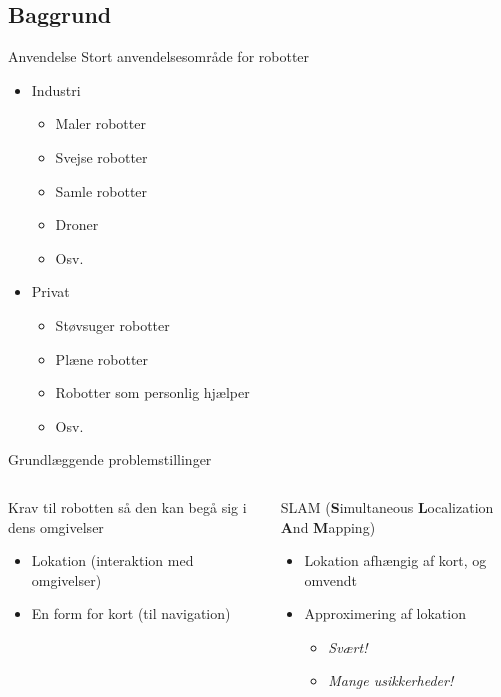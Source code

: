 \subsection{Baggrund}
\begin{frame}[fragile]{Anvendelse}
	Stort anvendelsesområde for robotter
	\begin{itemize}
		\item Industri
		\begin{itemize}
		\item Maler robotter
		\item Svejse robotter
		\item Samle robotter
		\item Droner
		\item Osv.
		\end{itemize}
		\item Privat
		\begin{itemize}
		\item Støvsuger robotter
		\item Plæne robotter
		\item Robotter som personlig hjælper
		\item Osv.
		\end{itemize}
	\end{itemize}
\end{frame}

\begin{frame}[fragile]{Grundlæggende problemstillinger}
	\begin{columns}
		\begin{column}{0.5\textwidth}
			Krav til robotten så den kan begå sig i dens omgivelser
			\linespace
			\begin{itemize}
				\item Lokation (interaktion med omgivelser)
				\item En form for kort (til navigation)
			\end{itemize}
		\end{column}
		\pause
		\begin{column}{0.5\textwidth}
			SLAM (\textbf{S}imultaneous \textbf{L}ocalization \textbf{A}nd \textbf{M}apping)
			\linespace
			\begin{itemize}
				\item Lokation afhængig af kort, og omvendt
				\item Approximering af lokation
				\begin{itemize}
				\item \textit{Svært!}
				\item \textit{Mange usikkerheder!}
				\end{itemize}
			\end{itemize}
		\end{column}
\end{columns}
\end{frame}



